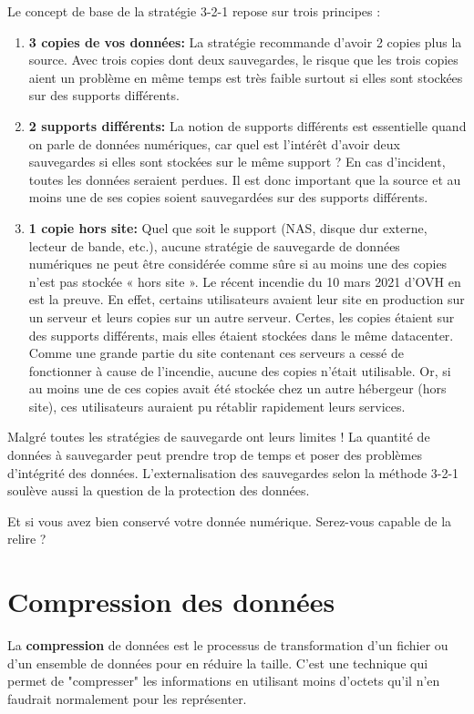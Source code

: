 \documentclass[11pt, a4paper]{book}
\begin{document}
Le concept de base de la stratégie 3-2-1 repose sur trois principes :
\begin{enumerate}
    \item[->] \textbf{{\huge 3} copies de vos données:} La stratégie recommande d’avoir 2 copies plus la source. Avec trois copies dont deux sauvegardes, le risque que les trois copies aient un problème en même temps est très faible surtout si elles sont stockées sur des supports différents.

    \item[->] \textbf{{\huge 2} supports différents:} La notion de supports différents est essentielle quand on parle de données numériques, car quel est l’intérêt d’avoir deux sauvegardes si elles sont stockées sur le même support ? En cas d’incident, toutes les données seraient perdues. Il est donc important que la source et au moins une de ses copies soient sauvegardées sur des supports différents.

    \item[->] \textbf{{\huge 1} copie hors site:} Quel que soit le support (NAS, disque dur externe, lecteur de bande, etc.), aucune stratégie de sauvegarde de données numériques ne peut être considérée comme sûre si au moins une des copies n’est pas stockée « hors site ». Le récent incendie du 10 mars 2021 d’OVH en est la preuve. En effet, certains utilisateurs avaient leur site en production sur un serveur et leurs copies sur un autre serveur. Certes, les copies étaient sur des supports différents, mais elles étaient stockées dans le même datacenter. Comme une grande partie du site contenant ces serveurs a cessé de fonctionner à cause de l’incendie, aucune des copies n’était utilisable. Or, si au moins une de ces copies avait été stockée chez un autre hébergeur (hors site), ces utilisateurs auraient pu rétablir rapidement leurs services.
\end{enumerate}

Malgré toutes les stratégies de sauvegarde ont leurs limites ! La quantité de données à sauvegarder peut prendre trop de temps et poser des problèmes d’intégrité des données. L’externalisation des sauvegardes selon la méthode 3-2-1 soulève aussi la question de la protection des données. 

Et si vous avez bien conservé votre donnée numérique. Serez-vous capable de la relire ?

\section{Compression des données}
La \textbf{compression} de données est le processus de transformation d'un fichier ou d'un ensemble de données pour en réduire la taille. 
C'est une technique qui permet de "compresser" les informations en utilisant moins d'octets qu'il n'en faudrait normalement pour les représenter.
\end{document}
